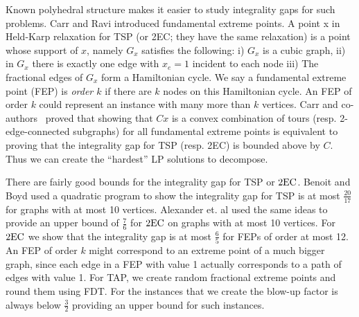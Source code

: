 Known polyhedral structure makes it easier to study integrality gaps for such problems. Carr and Ravi \cite{carr-ravi} introduced fundamental extreme points. A point x in Held-Karp relaxation for TSP (or 2EC; they have the same relaxation) is a point whose support of $x$, namely $G_x$ satisfies the following: i)  $G_x$ is a cubic graph, ii) in $G_x$ there is exactly one edge with $x_e=1$ incident to each node iii) The fractional edges of $G_x$ form a Hamiltonian cycle.  We say a fundamental extreme point (FEP) is {\em order $k$} if there are $k$ nodes on this Hamiltonian cycle. An FEP of order $k$ could represent an instance with many more than $k$ vertices. Carr and co-authors~\cite{CV,carr-ravi,BC11} proved that showing that $Cx$ is a convex combination of tours (resp. 2-edge-connected subgraphs) for all fundamental extreme points is equivalent to proving that the integrality gap for TSP (resp. 2EC) is bounded above by $C$. Thus we can create the ``hardest'' LP solutions to decompose.

There are fairly good bounds for the integrality gap for TSP or $\operatorname{2EC}$. Benoit and Boyd \cite{TSPcompute} used a quadratic program to show the integrality gap for TSP is at most $\frac{20}{17}$ for graphs with at most 10 vertices. Alexander et. al \cite{abe} used the same ideas to provide an upper bound of $\frac{7}{6}$ for $\operatorname{2EC}$ on graphs with at most 10 vertices. For $\operatorname{2EC}$ we show that the integrality gap is at most $\frac{6}{5}$ for FEPs of order at most 12. An FEP of order $k$ might correspond to an extreme point of a much bigger graph, since each edge in a FEP with value 1 actually corresponds to a path of edges with value 1.
For TAP, we create random fractional extreme points and round them using FDT. For the instances that we create the blow-up factor is always below $\frac{3}{2}$ providing an upper bound for such instances.




